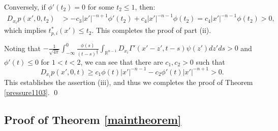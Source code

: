 \documentclass{amsart}
\numberwithin{equation}{section}
\newcommand{\Rn}{{\mathbb R}^{n-1}}
\newcommand{\Ga}{\Gamma}
\begin{document}
Conversely, if $\phi'(t_2) = 0$ for some $t_2 \leq 1$, then:
  \begin{align*}
  D_{x_i} p(x', 0,t_2)& > - c_3 |x'|^{-n +1} \phi' (t_2) + c_4 |x'|^{-n -1} \phi(t_2)  = c_4 |x'|^{-n -1} \phi(t_2) > 0,
  \end{align*}
which implies $t_{p,i}^* (x') \leq t_2$. This completes the proof of part (ii).

 
Noting that   $ - \frac{1}{\sqrt{4 \pi}} \int_{-\infty}^0 \frac{\phi( s)  }{(t -s)^{\frac{3}{2}}} 
  \int_{\Rn} D_{x_i} \Ga' (x' -z', t-s) \psi(z') dz' ds > 0$ and $\phi'(t) \leq 0$ for $ 1 < t<2$, we can see that  there are $ c_1, c_2 > 0$ such that 
 \begin{equation}  \label{pressure260410} 
D_{x_i} p(x', 0,t) \geq  c_1 \phi(t)|x'|^{-n -1}  -  c_2\phi' (t) |x'|^{-n +1} >0.
\end{equation}
This establishes the assertion (iii), and thus we completes the proof of Theorem \ref{pressure1103}.
\qed   
   
   
 
 
\subsection{Proof of Theorem \ref{maintheorem} }
\label{mainsection}


 
\end{document}
